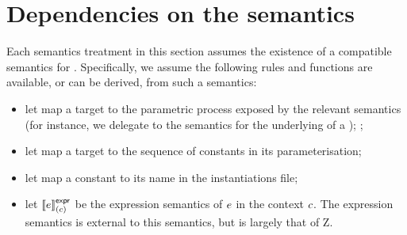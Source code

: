 \section{Dependencies on the \robochart{} semantics}


Each semantics treatment in this section assumes the existence of a compatible
semantics for \robochart.  Specifically, we assume the following rules and
functions are available, or can be derived, from such a semantics:

\begin{itemize}
\item
	let \targetProcess{-} map a target to the parametric
	process exposed by the relevant \tockcsp{} semantics (for instance,
	we delegate to the \robochart{} semantics for the underlying
	\mrcmodule{} of a \mrcmoduletarget);
	;
\item
	let \targetParams{-} map a target to the sequence of
	constants in its parameterisation;
\item
	let \constName{-} map a constant to its name in the \robochart{}
	instantiations file;
\item
	let \(\llbracket e \rrbracket^{\mathsf{expr}}_{(c)}\) be the expression semantics of 
	\(e\) in the context \(c\).  The expression semantics
	is external to this semantics, but is largely that of Z.
\end{itemize}

